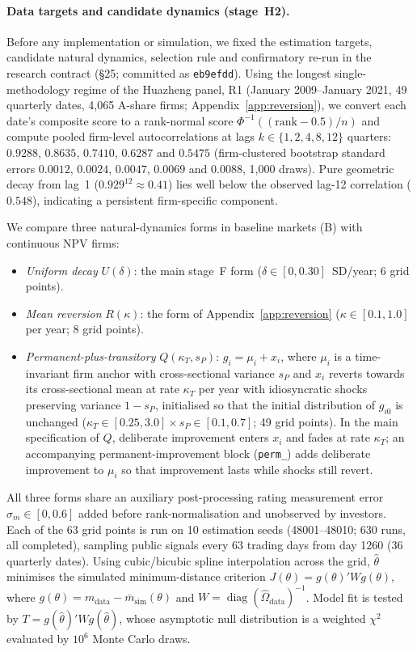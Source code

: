 \documentclass[11pt]{article}
\begin{document}
\paragraph{Data targets and candidate dynamics (stage~H2).} Before any implementation or simulation, we fixed the estimation targets, candidate natural dynamics, selection rule and confirmatory re-run in the research contract (\S25; committed as \texttt{eb9efdd}). Using the longest single-methodology regime of the Huazheng panel, R1 (January 2009--January 2021, 49 quarterly dates, 4,065 A-share firms; Appendix~\ref{app:reversion}), we convert each date's composite score to a rank-normal score $\Phi^{-1}((\text{rank}-0.5)/n)$ and compute pooled firm-level autocorrelations at lags $k \in \{1, 2, 4, 8, 12\}$ quarters: $0.9288$, $0.8635$, $0.7410$, $0.6287$ and $0.5475$ (firm-clustered bootstrap standard errors $0.0012$, $0.0024$, $0.0047$, $0.0069$ and $0.0088$, 1,000 draws). Pure geometric decay from lag~1 ($0.929^{12} \approx 0.41$) lies well below the observed lag-12 correlation ($0.548$), indicating a persistent firm-specific component.

We compare three natural-dynamics forms in baseline markets (B) with continuous NPV firms:
\begin{itemize}[leftmargin=*]
\item \emph{Uniform decay} $U(\delta)$: the main stage~F form ($\delta \in [0, 0.30]$~SD/year; 6 grid points).
\item \emph{Mean reversion} $R(\kappa)$: the form of Appendix~\ref{app:reversion} ($\kappa \in [0.1, 1.0]$ per year; 8 grid points).
\item \emph{Permanent-plus-transitory} $Q(\kappa_T, s_P)$: $g_i = \mu_i + x_i$, where $\mu_i$ is a time-invariant firm anchor with cross-sectional variance $s_P$ and $x_i$ reverts towards its cross-sectional mean at rate $\kappa_T$ per year with idiosyncratic shocks preserving variance $1 - s_P$, initialised so that the initial distribution of $g_{i0}$ is unchanged ($\kappa_T \in [0.25, 3.0] \times s_P \in [0.1, 0.7]$; 49 grid points). In the main specification of $Q$, deliberate improvement enters $x_i$ and fades at rate $\kappa_T$; an accompanying permanent-improvement block (\texttt{perm\_}) adds deliberate improvement to $\mu_i$ so that improvement lasts while shocks still revert.
\end{itemize}
All three forms share an auxiliary post-processing rating measurement error $\sigma_m \in [0, 0.6]$ added before rank-normalisation and unobserved by investors. Each of the 63 grid points is run on 10 estimation seeds (48001--48010; 630 runs, all completed), sampling public signals every 63 trading days from day 1260 (36 quarterly dates). Using cubic/bicubic spline interpolation across the grid, $\hat\theta$ minimises the simulated minimum-distance criterion $J(\theta) = g(\theta)' W g(\theta)$, where $g(\theta) = m_{\text{data}} - \bar m_{\text{sim}}(\theta)$ and $W = \operatorname{diag}(\hat\Omega_{\text{data}})^{-1}$. Model fit is tested by $T = g(\hat\theta)' W g(\hat\theta)$, whose asymptotic null distribution is a weighted $\chi^2$ evaluated by $10^6$ Monte Carlo draws.
\end{document}
